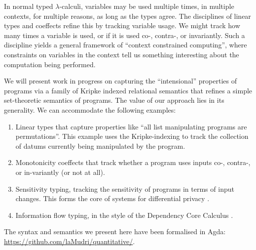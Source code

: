 In normal typed $\lambda$-calculi, variables may be used multiple
times, in multiple contexts, for multiple reasons, as long as the
types agree. The disciplines of linear types \cite{girard87linear} and
coeffects \cite{PetricekOM14,BrunelGMZ14,GhicaS14} refine this by
tracking variable usage. We might track how many times a variable is
used, or if it is used co-, contra-, or invariantly. Such a discipline
yields a general framework of ``context constrained computing'', where
constraints on variables in the context tell us something interesting
about the computation being performed.

We will present work in progress on capturing the ``intensional''
properties of programs via a family of Kripke indexed relational
semantics that refines a simple set-theoretic semantics of
programs. The value of our approach lies in its generality. We can
accommodate the following examples:
\begin{enumerate}
\item Linear types that capture properties like ``all list
  manipulating programs are permutations''. This example uses the
  Kripke-indexing to track the collection of datums currently being
  manipulated by the program.
\item Monotonicity coeffects that track whether a program uses inputs
  co-, contra-, or in-variantly (or not at all).
\item Sensitivity typing, tracking the sensitivity of programs in
  terms of input changes. This forms the core of systems for
  differential privacy \cite{reed10distance}.
\item Information flow typing, in the style of the Dependency Core
  Calculus \cite{abadi99core}.
\end{enumerate}

The syntax and semantics we present here have been formalised in Agda:
\url{https://github.com/laMudri/quantitative/}.